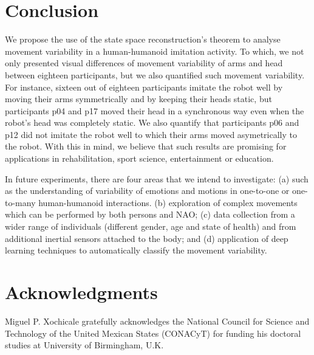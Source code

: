 \documentclass{sigchi}
\begin{document}
\section{Conclusion}
We propose the use of the state space reconstruction's theorem to analyse movement
variability in a human-humanoid imitation activity.
To which, we not only presented visual differences of movement variability
of arms and head between eighteen participants, but we also quantified such
movement variability.
For instance, sixteen out of eighteen participants imitate the robot well
by moving their arms symmetrically and by keeping their heads static, but
participants p04 and p17 moved their head in a synchronous way
even when the robot's head was completely static. We also quantify
that participants p06 and p12 did not imitate the robot well to which
their arms moved asymetrically to the robot. With this in mind, we believe
that such results are promising for applications in rehabilitation,
sport science, entertainment or education.

In future experiments, there are four areas that we intend to investigate:
(a) such as the understanding of variability of emotions and motions in
one-to-one or one-to-many human-humanoid interactions.
(b) exploration of complex movements which can be performed by both persons and NAO;
(c) data collection from a wider range of individuals
(different gender, age and state of health) and from additional inertial sensors
attached to the body; and
(d) application of deep learning techniques to automatically classify the
movement variability.







\section{Acknowledgments}
Miguel P. Xochicale gratefully acknowledges the National Council for Science
and Technology of the United Mexican States (CONACyT) for funding his doctoral
studies at University of Birmingham, U.K.
\end{document}
